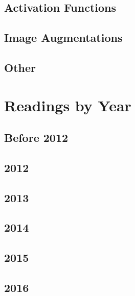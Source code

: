 \documentclass[7p]{article}
\begin{document}
\subsection*{Activation Functions}
\citet{NairH10, Maas13rectifiernonlinearities, hendrycks2016gaussian, Ramachandran2018}

\subsection*{Image Augmentations}
\citet{zhang2017mixup, yun2019cutmix, cubuk2020randaugment, wightman2021resnet}

\subsection*{Other}
\citet{kolesnikov2019big, wightman2021resnet}

\section*{Readings by Year}
\subsection*{Before 2012}
\citet{lecun1998gradient, NairH10}

\subsection*{2012}
\citet{krizhevsky2012imagenet}

\subsection*{2013}
\citet{Maas13rectifiernonlinearities}

\subsection*{2014}
\citet{srivastava2014dropout,  girshick2014rich, kingma2014adam}

\subsection*{2015}
\citet{ioffe2015batch, girshick2015fast, ren2015faster}

\subsection*{2016}
\citet{he2016deep,redmon2016you, salimans2016weight,hendrycks2016gaussian}
\end{document}
